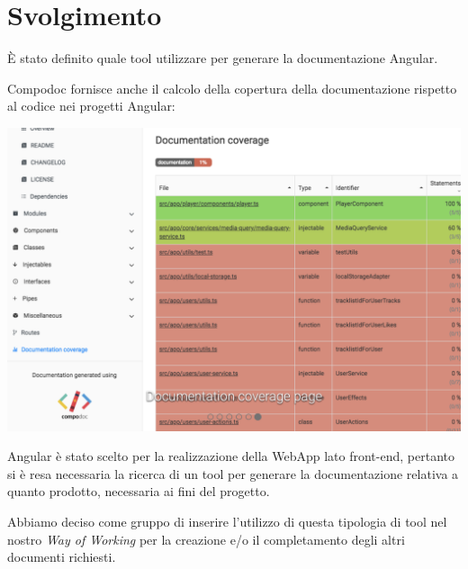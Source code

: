 \section{Svolgimento}

È stato definito quale tool utilizzare per generare la documentazione Angular.

Compodoc fornisce anche il calcolo della copertura della documentazione rispetto al codice nei progetti Angular:

\includegraphics[width = 0.9\linewidth]{img/compodoc.png}

Angular è stato scelto per la realizzazione della WebApp lato front-end, pertanto si è resa necessaria la ricerca di un tool per generare la documentazione relativa a quanto prodotto, necessaria ai fini del progetto.

Abbiamo deciso come gruppo di inserire l'utilizzo di questa tipologia di tool nel nostro {\it{Way of Working}} per la creazione e/o il completamento degli altri documenti richiesti.